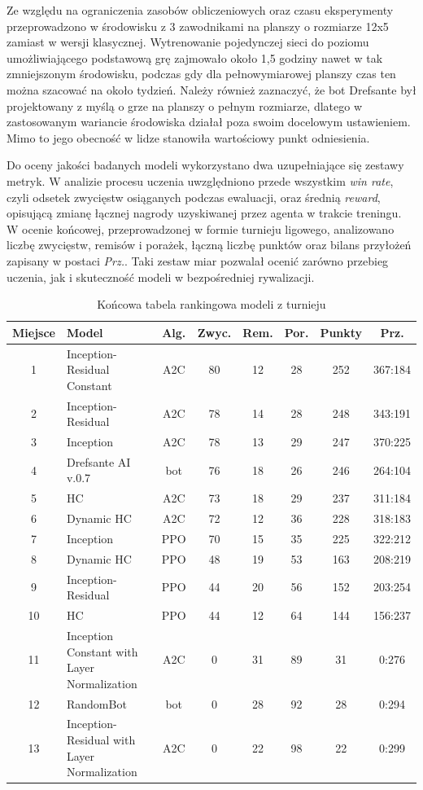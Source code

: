 Ze względu na ograniczenia zasobów obliczeniowych oraz czasu eksperymenty przeprowadzono w środowisku z 3 zawodnikami na planszy o rozmiarze 12x5 zamiast w wersji klasycznej. Wytrenowanie pojedynczej sieci do poziomu umożliwiającego podstawową grę zajmowało około 1,5 godziny nawet w tak zmniejszonym środowisku, podczas gdy dla pełnowymiarowej planszy czas ten można szacować na około tydzień. Należy również zaznaczyć, że bot Drefsante był projektowany z myślą o grze na planszy o pełnym rozmiarze, dlatego w zastosowanym wariancie środowiska działał poza swoim docelowym ustawieniem. Mimo to jego obecność w lidze stanowiła wartościowy punkt odniesienia.

Do oceny jakości badanych modeli wykorzystano dwa uzupełniające się zestawy metryk. W analizie procesu uczenia uwzględniono przede wszystkim \textit{win rate}, czyli odsetek zwycięstw osiąganych podczas ewaluacji, oraz średnią \textit{reward}, opisującą zmianę łącznej nagrody uzyskiwanej przez agenta w trakcie treningu. W ocenie końcowej, przeprowadzonej w formie turnieju ligowego, analizowano liczbę zwycięstw, remisów i porażek, łączną liczbę punktów oraz bilans przyłożeń zapisany w postaci \textit{Prz.}. Taki zestaw miar pozwalał ocenić zarówno przebieg uczenia, jak i skuteczność modeli w bezpośredniej rywalizacji.

\begin{table}[H]
	\centering
	\caption{Końcowa tabela rankingowa modeli z turnieju}
	\label{tab:liga-ranking-env3}
	\begin{tabular}{clcccccc}
		\hline
		Miejsce & Model & Alg. & Zwyc. & Rem. & Por. & Punkty & Prz. \\
		\hline
		1 & Inception-Residual Constant & A2C & 80 & 12 & 28 & 252 & 367:184 \\
		2 & Inception-Residual & A2C & 78 & 14 & 28 & 248 & 343:191 \\
		3 & Inception & A2C & 78 & 13 & 29 & 247 & 370:225 \\
		4 & Drefsante AI v.0.7 & bot & 76 & 18 & 26 & 246 & 264:104 \\
		5 & HC & A2C & 73 & 18 & 29 & 237 & 311:184 \\
		6 & Dynamic HC & A2C & 72 & 12 & 36 & 228 & 318:183 \\
		7 & Inception & PPO & 70 & 15 & 35 & 225 & 322:212 \\
		8 & Dynamic HC& PPO & 48 & 19 & 53 & 163 & 208:219 \\
		9 & Inception-Residual & PPO & 44 & 20 & 56 & 152 & 203:254 \\
		10 & HC & PPO & 44 & 12 & 64 & 144 & 156:237 \\
		11 & Inception Constant with Layer Normalization & A2C & 0 & 31 & 89 & 31 & 0:276 \\
		12 & RandomBot & bot & 0 & 28 & 92 & 28 & 0:294 \\
		13 & Inception-Residual with Layer Normalization & A2C & 0 & 22 & 98 & 22 & 0:299 \\
		\hline
	\end{tabular}
\end{table}



